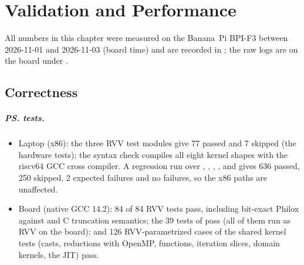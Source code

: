 \chapter{Validation and Performance}\label{r02:ch:results}

All numbers in this chapter were measured on the Banana~Pi BPI-F3 between 2026-11-01 and
2026-11-03 (board time) and are recorded in
; the raw logs are on the board
under .

\section{Correctness}\label{r02:sec:results-tests}

\paragraph{\ps{} tests.}
\begin{itemize}
  \item Laptop (x86): the three RVV test modules give 77 passed and 7 skipped (the
        hardware tests); the syntax check compiles all eight kernel shapes with the
        riscv64 GCC cross compiler. A regression run over ,
        , , ,
         and  gives 636 passed, 250 skipped,
        2 expected failures and no failures, so the x86 paths are unaffected.
  \item Board (native GCC 14.2): 84 of 84 RVV tests pass, including bit-exact Philox
        against  and C truncation semantics; the 39 tests of
         pass (all of them run as RVV on the board); and 126
        RVV-parametrized cases of the shared kernel tests (casts, reductions with
        OpenMP, functions, iteration slices, domain kernels, the JIT) pass.
\end{itemize}

